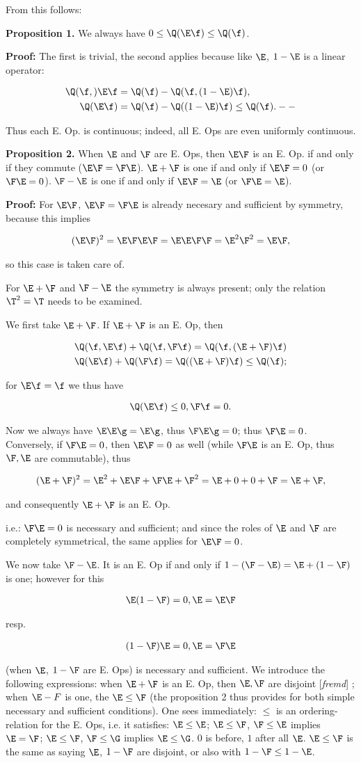 \documentclass{article}
\newcommand{\WTF}[1]{
[\it{\small{#1}}]
}
\newcommand{\uequ}[1]{
\begin{align*}
#1
\end{align*}
}
\renewcommand{\it}[1]{\textit{#1}}
\begin{document}
From this follows:

\textbf{Proposition 1.} We always have
$0 \leq \Q(\E\f) \leq \Q(\f)$.

\textbf{Proof:} The first is trivial, the second applies because like $\E$, $1-\E$ is a linear operator:
\uequ{
\Q(\f,)\E\f
 &= \Q(\f) - \Q(\f, (1-\E)\f),\\
\Q(\E\f)     &= \Q(\f) - \Q((1-\E)\f) \leq \Q(\f). --}


Thus each E. Op. is continuous; indeed, all E. Ops are even uniformly continuous.

\textbf{Proposition 2.} When $\E$ and $\F$ are E. Ops, then $\E\F$ is an E. Op. if and only if they commute ($\E\F = \F\E$).
$\E+\F$ is one if and only if $\E\F = 0$ (or $\F\E=0$). $\F-\E$ is
one if and only if $\E\F=\E$ (or $\F\E=\E$).

\textbf{Proof:} For $\E\F$, $\E\F=\F\E$ is already necesary and sufficient by symmetry, because this implies
\uequ{
(\E\F)^2 = \E\F\E\F = \E\E\F\F = \E^2\F^2 = \E\F,
}
so this case is taken care of.

For $\E+\F$ and $\F-\E$ the symmetry is always present; only the relation $\T^2=\T$ needs to be examined.

We first take $\E+\F$. If $\E+\F$ is an E. Op, then
\uequ{
\Q(\f,\E\f) + \Q(\f, \F\f) = \Q(\f, (\E+\F)\f)\\
\Q(\E\f)+ \Q(\F\f) = \Q((\E+\F)\f) \leq \Q(\f);
}
for $\E\f=\f$ we thus have
\uequ{
\Q(\E\f) \leq 0, \F\f=0.
}
Now we always have $\E\E\g=\E\g$, thus $\F\E\g=0$; thus $\F\E=0$. Conversely, if $\F\E=0$, then $\E\F=0$ as well (while $\F\E$ is an E. Op, thus $\F,\E$ are commutable), thus
\uequ{
(\E+\F)^2 = \E^2+\E\F + \F\E + \F^2 = \E + 0 + 0 + \F = \E+\F,
}
and consequently $\E+\F$ is an E. Op.

i.e.: $\F\E=0$ is necessary and sufficient; and since the roles of $\E$ and $\F$ are completely symmetrical, the same applies for $\E\F=0$.

We now take $\F-\E$. It is an E. Op if and only if $1-(\F-\E)=\E+(1-\F)$ is one; however for this
\uequ{
\E(1-\F)=0, \E = \E\F
}
resp.
\uequ{
(1-\F)\E = 0, \E = \F\E
}
(when $\E$, $1-\F$ are E. Ops) is necessary and sufficient. We introduce the following expressions: when $\E+\F$ is an E. Op, then $\E,\F$ are disjoint \WTF{fremd};  when $\E-F$ is one, the $\E \leq \F$ (the proposition 2 thus provides for both simple necessary and sufficient conditions). One sees immediately: $\leq$ is an ordering-relation for the E. Ops, i.e. it satisfies: $\E\leq\E$; $\E\leq\F$, $\F\leq\E$ implies $\E=\F$; $\E\leq\F$, $\F\leq\G$ implies $\E\leq\G$. $0$ is before, $1$ after all $\E$. $\E \leq \F$ is the same as saying $\E$, $1-\F$ are disjoint, or also with $1-\F\leq  1-\E$.
\end{document}
